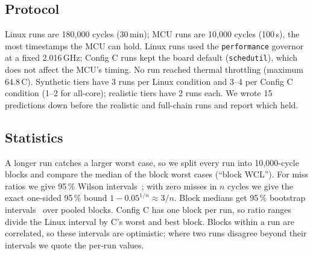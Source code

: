 \subsection{Protocol}
Linux runs are 180{,}000 cycles (30\,min); MCU runs are 10{,}000 cycles (100\,s), the most timestamps the MCU can hold. Linux runs used the \texttt{performance} governor at a fixed 2.016\,GHz; Config C runs kept the board default (\texttt{schedutil}), which does not affect the MCU's timing. No run reached thermal throttling (maximum 64.8\,\textdegree C). Synthetic tiers have 3 runs per Linux condition and 3--4 per Config C condition (1--2 for all-core); realistic tiers have 2 runs each. We wrote 15 predictions down before the realistic and full-chain runs and report which held.

\subsection{Statistics}
A longer run catches a larger worst case, so we split every run into 10{,}000-cycle blocks and compare the median of the block worst cases (``block WCL''). For miss ratios we give 95\,\% Wilson intervals~\cite{wilson1927}; with zero misses in $n$ cycles we give the exact one-sided 95\,\% bound $1-0.05^{1/n} \approx 3/n$. Block medians get 95\,\% bootstrap intervals~\cite{efron1993bootstrap} over pooled blocks. Config C has one block per run, so ratio ranges divide the Linux interval by C's worst and best block. Blocks within a run are correlated, so these intervals are optimistic; where two runs disagree beyond their intervals we quote the per-run values.
